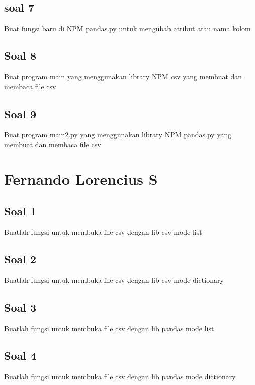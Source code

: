 \subsection{soal 7}
Buat fungsi baru di NPM pandas.py untuk mengubah atribut atau nama kolom


\subsection{Soal 8}
Buat program main yang menggunakan library NPM csv yang membuat dan membaca file csv


\subsection{Soal 9}
Buat program main2.py yang menggunakan library NPM pandas.py yang membuat dan membaca file csv





\section{Fernando Lorencius S}
\subsection{Soal 1}
Buatlah fungsi untuk membuka file csv dengan lib csv mode list


\subsection{Soal 2}
Buatlah fungsi untuk membuka file csv dengan lib csv mode dictionary


\subsection{Soal 3}
Buatlah fungsi untuk membuka file csv dengan lib pandas mode list


\subsection{Soal 4}
Buatlah fungsi untuk membuka file csv dengan lib pandas mode dictionary


